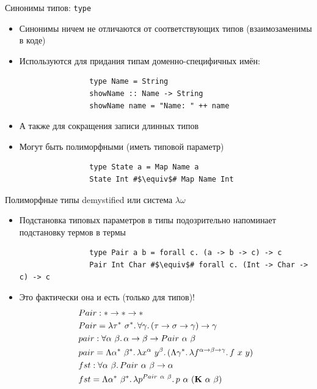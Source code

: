     \begin{frame}[fragile]{Синонимы типов: \texttt{type}}
        \begin{itemize}
            \item Синонимы ничем не отличаются от соответствующих типов (взаимозаменимы в коде)
            \item Используются для придания типам доменно-специфичных имён:
            \begin{verbatim}
                type Name = String
                showName :: Name -> String
                showName name = "Name: " ++ name
            \end{verbatim}
            \item А также для сокращения записи длинных типов
            \item Могут быть полиморфными (иметь типовой параметр)
            \begin{verbatim}
                type State a = Map Name a
                State Int #$\equiv$# Map Name Int
            \end{verbatim}
        \end{itemize}
    \end{frame}

    \begin{frame}[fragile]{Полиморфные типы demystified или система $\lambda \omega$ \advancedslide\popslide}
        \begin{itemize}
            \item Подстановка типовых параметров в типы подозрительно напоминает подстановку термов в термы
            \begin{verbatim}
                type Pair a b = forall c. (a -> b -> c) -> c
                Pair Int Char #$\equiv$# forall c. (Int -> Char -> c) -> c
            \end{verbatim}
            \item[\advanced] Это фактически она и есть (только для типов)!
            \begin{align*}
                &Pair : * \rightarrow * \rightarrow * \\
                &Pair = \lambda \tau^*~\sigma^*\ldotp\forall \gamma\ldotp(\tau\rightarrow\sigma\rightarrow\gamma)\to\gamma \\
                &pair : \forall \alpha~\beta\ldotp\alpha \rightarrow \beta \rightarrow Pair~\alpha~\beta \\
                &pair = \Lambda \alpha^*~\beta^*\ldotp\lambda x^\alpha~y^\beta\ldotp(\Lambda \gamma^*\ldotp\lambda f^{\alpha\rightarrow\beta\rightarrow\gamma}\ldotp f~x~y) \\
                &fst : \forall \alpha~\beta\ldotp Pair~\alpha~\beta\rightarrow \alpha \\
                &fst = \Lambda \alpha^*~\beta^*\ldotp\lambda p^{Pair~\alpha~\beta}\ldotp p~\alpha~(\mathbf{K}~\alpha~\beta)
            \end{align*}
        \end{itemize}
    \end{frame}


